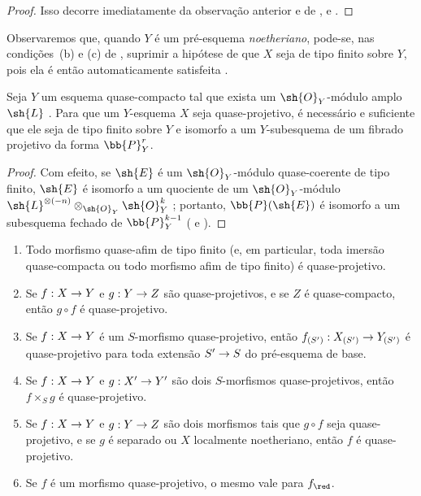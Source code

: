 \documentclass[oneside,10pt]{amsart}
\makeatletter
\newcommand{\ega@arrow}[2]{\mathchoice{#1}{#2}{#2}{#2}}
\renewcommand{\to}{\ega@arrow{\longrightarrow}{\rightarrow}}
\newcommand{\oldpage}[2][]{\marginnote{\normalfont\footnotesize\textbf{#1}~|~#2}\ignorespaces}
\let\EGAOriginalLabel\label
\renewcommand{\label}[1]{\phantomsection\EGAOriginalLabel{#1}}
\makeatother
\begin{document}
\begin{proof}
Isso decorre imediatamente da observação anterior e de ,  e .
\end{proof}

Observaremos que, quando $Y$ é um pré-esquema \emph{noetheriano}, pode-se, nas condições~(b) e (c) de , suprimir a hipótese de que $X$ seja de tipo finito sobre $Y$, pois ela é então automaticamente satisfeita .

\begin{corollary}[5.3.3]
\label{II.5.3.3}
Seja $Y$ um esquema quase-compacto tal que exista um $\sh{O}_Y$-módulo amplo $\sh{L}$ .
Para que um $Y$-esquema $X$ seja quase-projetivo, é necessário e suficiente que ele seja de tipo finito sobre $Y$ e isomorfo a um $Y$-subesquema de um fibrado projetivo da forma $\bb{P}_Y^r$.
\end{corollary}

\begin{proof}
Com efeito, se $\sh{E}$ é um $\sh{O}_Y$-módulo quase-coerente de tipo finito, $\sh{E}$ é isomorfo a um quociente de um $\sh{O}_Y$-módulo $\sh{L}^{\otimes(-n)}\otimes_{\sh{O}_Y}\sh{O}_Y^k$ ; portanto, $\bb{P}(\sh{E})$ é isomorfo a um subesquema fechado de $\bb{P}_Y^{k-1}$ ( e ).
\end{proof}

\begin{proposition}[5.3.4]
\label{II.5.3.4}
\medskip\noindent
\begin{enumerate}
  \item[{\rm(i)}] Todo morfismo quase-afim de tipo finito (e, em particular, toda imersão quase-compacta ou todo morfismo afim de tipo finito) é quase-projetivo.
  \item[{\rm(ii)}] Se $f:X\to Y$ e $g:Y\to Z$ são quase-projetivos, e se $Z$ é quase-compacto, então $g\circ f$ é quase-projetivo.

\oldpage[II]{100}
  \item[{\rm(iii)}] Se $f:X\to Y$ é um $S$-morfismo quase-projetivo, então $f_{(S')}:X_{(S')}\to Y_{(S')}$ é quase-projetivo para toda extensão $S'\to S$ do pré-esquema de base.
  \item[{\rm(iv)}] Se $f:X\to Y$ e $g:X'\to Y'$ são dois $S$-morfismos quase-projetivos, então $f\times_S g$ é quase-projetivo.
  \item[{\rm(v)}] Se $f:X\to Y$ e $g:Y\to Z$ são dois morfismos tais que $g\circ f$ seja quase-projetivo, e se $g$ é separado ou $X$ localmente noetheriano, então $f$ é quase-projetivo.
  \item[{\rm(vi)}] Se $f$ é um morfismo quase-projetivo, o mesmo vale para $f_\red$.
\end{enumerate}
\end{proposition}
\end{document}
